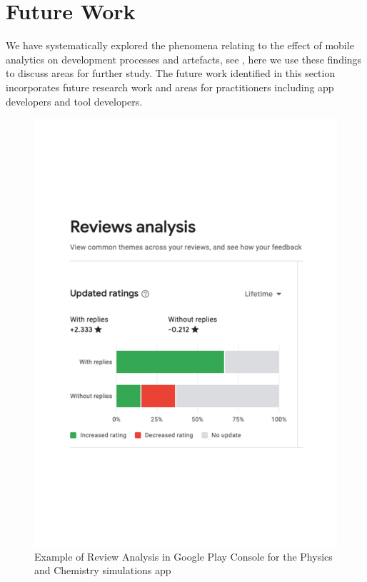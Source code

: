 \clearpage
\section{Future Work}
We have systematically explored the phenomena relating to the effect of mobile analytics on development processes and artefacts, see , here we use these findings to discuss areas for further study. The future work identified in this section incorporates future research work and areas for practitioners including app developers and tool developers.

\begin{figure}
    \centering
    \includegraphics[width=\linewidth]{images/google-play-console/PhET-Review-Analysis-Screenshot-2022-09-07.pdf}
    \caption{Example of Review Analysis in Google Play Console for the Physics and Chemistry simulations app}
    \label{fig:PhET-Review-Analysis-Screenshot-2022-09-07}
\end{figure}

